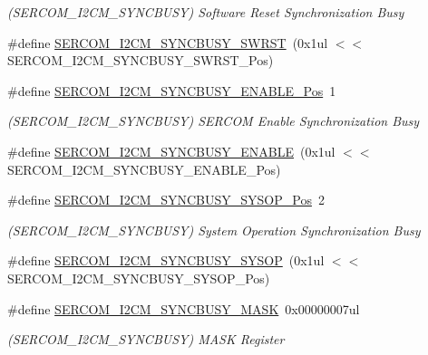 \begin{DoxyCompactItemize}
\begin{DoxyCompactList}\small\item\em (S\+E\+R\+C\+O\+M\+\_\+\+I2\+C\+M\+\_\+\+S\+Y\+N\+C\+B\+U\+SY) Software Reset Synchronization Busy \end{DoxyCompactList}\item 
\#define \mbox{\hyperlink{group___s_a_m_d21___s_e_r_c_o_m_ga5ce8e6049a84583cfcf59746a360123b}{S\+E\+R\+C\+O\+M\+\_\+\+I2\+C\+M\+\_\+\+S\+Y\+N\+C\+B\+U\+S\+Y\+\_\+\+S\+W\+R\+ST}}~(0x1ul $<$$<$ S\+E\+R\+C\+O\+M\+\_\+\+I2\+C\+M\+\_\+\+S\+Y\+N\+C\+B\+U\+S\+Y\+\_\+\+S\+W\+R\+S\+T\+\_\+\+Pos)
\item 
\#define \mbox{\hyperlink{group___s_a_m_d21___s_e_r_c_o_m_gabca5a56501c3055e38ef4d0b2c5f74c3}{S\+E\+R\+C\+O\+M\+\_\+\+I2\+C\+M\+\_\+\+S\+Y\+N\+C\+B\+U\+S\+Y\+\_\+\+E\+N\+A\+B\+L\+E\+\_\+\+Pos}}~1
\begin{DoxyCompactList}\small\item\em (S\+E\+R\+C\+O\+M\+\_\+\+I2\+C\+M\+\_\+\+S\+Y\+N\+C\+B\+U\+SY) S\+E\+R\+C\+OM Enable Synchronization Busy \end{DoxyCompactList}\item 
\#define \mbox{\hyperlink{group___s_a_m_d21___s_e_r_c_o_m_ga6ab980373779ddd0b05d75426900d912}{S\+E\+R\+C\+O\+M\+\_\+\+I2\+C\+M\+\_\+\+S\+Y\+N\+C\+B\+U\+S\+Y\+\_\+\+E\+N\+A\+B\+LE}}~(0x1ul $<$$<$ S\+E\+R\+C\+O\+M\+\_\+\+I2\+C\+M\+\_\+\+S\+Y\+N\+C\+B\+U\+S\+Y\+\_\+\+E\+N\+A\+B\+L\+E\+\_\+\+Pos)
\item 
\#define \mbox{\hyperlink{group___s_a_m_d21___s_e_r_c_o_m_gaaf10e07af1f2ffa651601691ddd2f381}{S\+E\+R\+C\+O\+M\+\_\+\+I2\+C\+M\+\_\+\+S\+Y\+N\+C\+B\+U\+S\+Y\+\_\+\+S\+Y\+S\+O\+P\+\_\+\+Pos}}~2
\begin{DoxyCompactList}\small\item\em (S\+E\+R\+C\+O\+M\+\_\+\+I2\+C\+M\+\_\+\+S\+Y\+N\+C\+B\+U\+SY) System Operation Synchronization Busy \end{DoxyCompactList}\item 
\#define \mbox{\hyperlink{group___s_a_m_d21___s_e_r_c_o_m_gaa4f6c068baa7bfcf117d457a5ab54e05}{S\+E\+R\+C\+O\+M\+\_\+\+I2\+C\+M\+\_\+\+S\+Y\+N\+C\+B\+U\+S\+Y\+\_\+\+S\+Y\+S\+OP}}~(0x1ul $<$$<$ S\+E\+R\+C\+O\+M\+\_\+\+I2\+C\+M\+\_\+\+S\+Y\+N\+C\+B\+U\+S\+Y\+\_\+\+S\+Y\+S\+O\+P\+\_\+\+Pos)
\item 
\#define \mbox{\hyperlink{group___s_a_m_d21___s_e_r_c_o_m_ga968affbd2d6434b32c1f455315f5fb2f}{S\+E\+R\+C\+O\+M\+\_\+\+I2\+C\+M\+\_\+\+S\+Y\+N\+C\+B\+U\+S\+Y\+\_\+\+M\+A\+SK}}~0x00000007ul
\begin{DoxyCompactList}\small\item\em (S\+E\+R\+C\+O\+M\+\_\+\+I2\+C\+M\+\_\+\+S\+Y\+N\+C\+B\+U\+SY) M\+A\+SK Register \end{DoxyCompactList}\item 
$$
\end{DoxyCompactItemize}
